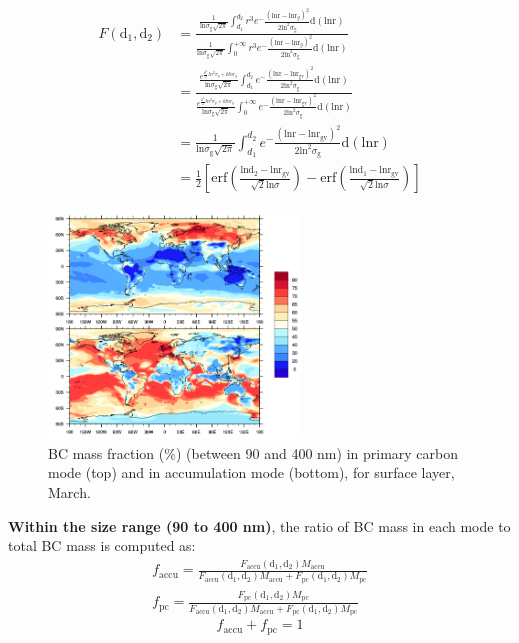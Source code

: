\documentclass[11pt]{article}
\begin{document}
\begin{align*}
F(\text{d}_{1}, \text{d}_{2}) &= \frac{\frac{1}{\text{ln}\sigma_{\text{g}}\sqrt{2\pi}}\int_{d_{1}}^{d_{2}}r^3e^-\frac{(\text{lnr} - \text{lnr}_{g})^2}{2\text{ln}^2\sigma_{\text{g}}}\text{d}(\text{lnr})}
{\frac{1}{\text{ln}\sigma_{\text{g}}\sqrt{2\pi}}\int_{0}^{+\infty}r^3e^-\frac{(\text{lnr} - \text{lnr}_{g})^2}{2\text{ln}^2\sigma_{\text{g}}}\text{d}(\text{lnr})}  \\
&=\frac{\frac{e^{\frac{k^2}{2}ln^2\sigma_{g}+klnr_{g}}}{\text{ln}\sigma_{\text{g}}\sqrt{2\pi}}\int_{d_{1}}^{d_{2}}e^-\frac{(\text{lnr} - \text{lnr}_{\text{gv}})^2}{2\text{ln}^2\sigma_{\text{g}}}\text{d}(\text{lnr})}{\frac{e^{\frac{k^2}{2}ln^2\sigma_{g}+klnr_{g}}}{\text{ln}\sigma_{\text{g}}\sqrt{2\pi}}\int_{0}^{+\infty}e^-\frac{(\text{lnr} - \text{lnr}_{\text{gv}})^2}{2\text{ln}^2\sigma_{\text{g}}}\text{d}(\text{lnr})}\\
&=\frac{1}{\text{ln}\sigma_{\text{g}}\sqrt{2\pi}}\int_{d_{1}}^{d_{2}}e^-\frac{(\text{lnr} - \text{lnr}_{\text{gv}})^2}{2\text{ln}^2\sigma_{\text{g}}}\text{d}(\text{lnr}) \\
&=\frac{1}{2}[\text{erf}(\frac{\text{lnd}_{2} - \text{lnr}_{\text{gv}}}{\sqrt{2}\text{ln}\sigma})-\text{erf}(\frac{\text{lnd}_{1} - \text{lnr}_{\text{gv}}}{\sqrt{2}\text{ln}\sigma})]
\end{align*}

\begin{figure}[!h] 
	\begin{center}
		\includegraphics[width = 0.6\textwidth]{Rplot02}
		\caption[]{\label{fig_P2} BC mass fraction ($\%$) (between 90 and 400 nm) in primary carbon mode (top) and in accumulation mode (bottom), for surface layer, March.}
	\end{center}
\end{figure}


\noindent \textbf{Within the size range (90 to 400 nm)}, the ratio of BC mass in each mode to total BC mass is computed as:
\begin{align*}
f_{\text{accu}} = \frac{F_{\text{accu}}(\text{d}_{1}, \text{d}_{2})M_{\text{accu}}}{F_{\text{accu}}(\text{d}_{1}, \text{d}_{2})M_{\text{accu}}+F_{\text{pc}}(\text{d}_{1}, \text{d}_{2})M_{\text{pc}}}\\
f_{\text{pc}} = \frac{F_{\text{pc}}(\text{d}_{1}, \text{d}_{2})M_{\text{pc}}}{F_{\text{accu}}(\text{d}_{1}, \text{d}_{2})M_{\text{accu}}+F_{\text{pc}}(\text{d}_{1}, \text{d}_{2})M_{\text{pc}}}
\end{align*}
\[f_{\text{accu}} + f_{\text{pc}} = 1\]
\end{document}
